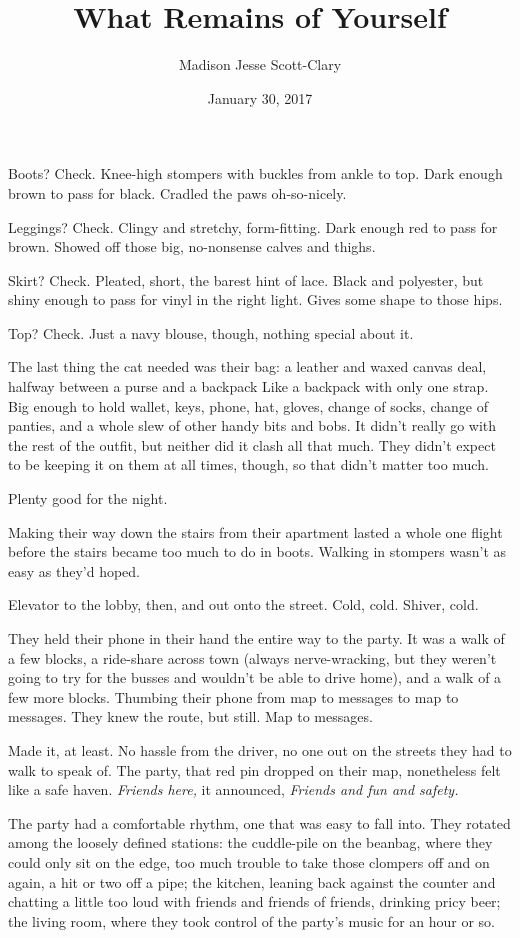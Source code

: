 \documentclass[12pt,letterpaper,oneside]{memoir}
\title{What Remains of Yourself}
\author{Madison Jesse Scott-Clary}
\date{January 30, 2017}
\begin{document}
  \maketitle

  Boots? Check. Knee-high stompers with buckles from ankle to top. Dark
  enough brown to pass for black. Cradled the paws oh-so-nicely.

  Leggings? Check. Clingy and stretchy, form-fitting. Dark enough red to
  pass for brown. Showed off those big, no-nonsense calves and thighs.

  Skirt? Check. Pleated, short, the barest hint of lace. Black and
  polyester, but shiny enough to pass for vinyl in the right light. Gives
  some shape to those hips.

  Top? Check. Just a navy blouse, though, nothing special about it.

  The last thing the cat needed was their bag: a leather and waxed canvas
  deal, halfway between a purse and a backpack Like a backpack with only
  one strap. Big enough to hold wallet, keys, phone, hat, gloves, change
  of socks, change of panties, and a whole slew of other handy bits and
  bobs. It didn't really go with the rest of the outfit, but neither did
  it clash all that much. They didn't expect to be keeping it on them at
  all times, though, so that didn't matter too much.

  Plenty good for the night.

  Making their way down the stairs from their apartment lasted a whole one
  flight before the stairs became too much to do in boots. Walking in
  stompers wasn't as easy as they'd hoped.

  Elevator to the lobby, then, and out onto the street. Cold, cold.
  Shiver, cold.

  They held their phone in their hand the entire way to the party. It was
  a walk of a few blocks, a ride-share across town (always nerve-wracking,
  but they weren't going to try for the busses and wouldn't be able to
  drive home), and a walk of a few more blocks. Thumbing their phone from
  map to messages to map to messages. They knew the route, but still. Map
  to messages.

  Made it, at least. No hassle from the driver, no one out on the streets
  they had to walk to speak of. The party, that red pin dropped on their
  map, nonetheless felt like a safe haven. \emph{Friends here,} it
  announced, \emph{Friends and fun and safety.}

  The party had a comfortable rhythm, one that was easy to fall into. They
  rotated among the loosely defined stations: the cuddle-pile on the
  beanbag, where they could only sit on the edge, too much trouble to take
  those clompers off and on again, a hit or two off a pipe; the kitchen,
  leaning back against the counter and chatting a little too loud with
  friends and friends of friends, drinking pricy beer; the living room,
  where they took control of the party's music for an hour or so.
\end{document}
